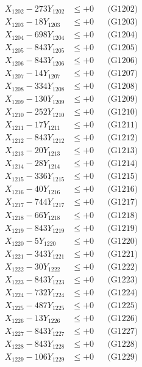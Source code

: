 \documentclass[a4paper,10pt]{article}
\begin{document}
{\begin{align}
X_{1202} - 273Y_{1202} &\leq +0 && \text{(G1202)} \\
X_{1203} - 18Y_{1203} &\leq +0 && \text{(G1203)} \\
X_{1204} - 698Y_{1204} &\leq +0 && \text{(G1204)} \\
X_{1205} - 843Y_{1205} &\leq +0 && \text{(G1205)} \\
X_{1206} - 843Y_{1206} &\leq +0 && \text{(G1206)} \\
X_{1207} - 14Y_{1207} &\leq +0 && \text{(G1207)} \\
X_{1208} - 334Y_{1208} &\leq +0 && \text{(G1208)} \\
X_{1209} - 130Y_{1209} &\leq +0 && \text{(G1209)} \\
X_{1210} - 252Y_{1210} &\leq +0 && \text{(G1210)} \\
\allowbreak
X_{1211} - 17Y_{1211} &\leq +0 && \text{(G1211)} \\
X_{1212} - 843Y_{1212} &\leq +0 && \text{(G1212)} \\
X_{1213} - 20Y_{1213} &\leq +0 && \text{(G1213)} \\
X_{1214} - 28Y_{1214} &\leq +0 && \text{(G1214)} \\
X_{1215} - 336Y_{1215} &\leq +0 && \text{(G1215)} \\
X_{1216} - 40Y_{1216} &\leq +0 && \text{(G1216)} \\
X_{1217} - 744Y_{1217} &\leq +0 && \text{(G1217)} \\
X_{1218} - 66Y_{1218} &\leq +0 && \text{(G1218)} \\
X_{1219} - 843Y_{1219} &\leq +0 && \text{(G1219)} \\
X_{1220} - 5Y_{1220} &\leq +0 && \text{(G1220)} \\
\allowbreak
X_{1221} - 343Y_{1221} &\leq +0 && \text{(G1221)} \\
X_{1222} - 30Y_{1222} &\leq +0 && \text{(G1222)} \\
X_{1223} - 843Y_{1223} &\leq +0 && \text{(G1223)} \\
X_{1224} - 732Y_{1224} &\leq +0 && \text{(G1224)} \\
X_{1225} - 487Y_{1225} &\leq +0 && \text{(G1225)} \\
X_{1226} - 13Y_{1226} &\leq +0 && \text{(G1226)} \\
X_{1227} - 843Y_{1227} &\leq +0 && \text{(G1227)} \\
X_{1228} - 843Y_{1228} &\leq +0 && \text{(G1228)} \\
X_{1229} - 106Y_{1229} &\leq +0 && \text{(G1229)} \\

\end{align}}
\end{document}
